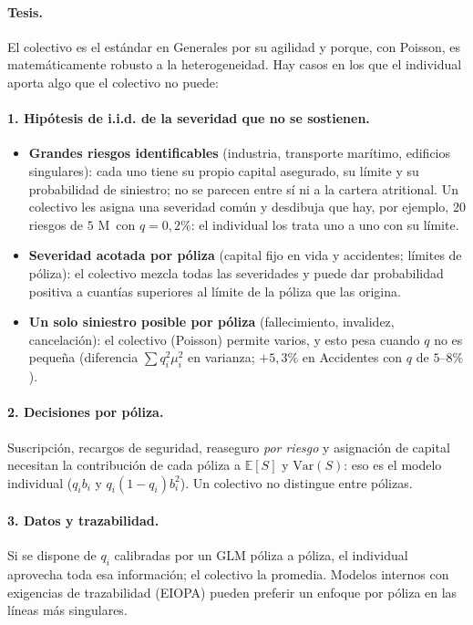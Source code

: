 \documentclass[a4paper,12pt]{article}
\newcommand{\euro}{\texteuro}
\newcommand{\E}{\mathbb{E}}
\newcommand{\Var}{\mathrm{Var}}
\begin{document}
\paragraph{Tesis.} El colectivo es el est\'andar en Generales por su agilidad y porque, con Poisson, es matem\'aticamente robusto a la heterogeneidad. Hay casos en los que el individual aporta algo que el colectivo no puede:

\paragraph{1. Hipótesis de i.i.d. de la severidad que no se sostienen.}
\begin{itemize}[leftmargin=*,itemsep=1pt]
\item \textbf{Grandes riesgos identificables} (industria, transporte mar\'itimo, edificios singulares): cada uno tiene su propio capital asegurado, su l\'imite y su probabilidad de siniestro; no se parecen entre s\'i ni a la cartera atritional. Un colectivo les asigna una severidad com\'un y desdibuja que hay, por ejemplo, 20 riesgos de $5$ M\euro\ con $q=0{,}2\%$: el individual los trata uno a uno con su l\'imite.
\item \textbf{Severidad acotada por p\'oliza} (capital fijo en vida y accidentes; l\'imites de p\'oliza): el colectivo mezcla todas las severidades y puede dar probabilidad positiva a cuant\'ias superiores al l\'imite de la p\'oliza que las origina.
\item \textbf{Un solo siniestro posible por p\'oliza} (fallecimiento, invalidez, cancelaci\'on): el colectivo (Poisson) permite varios, y esto pesa cuando $q$ no es peque\~na (diferencia $\sum q_i^2\mu_i^2$ en varianza; $+5{,}3\%$ en Accidentes con $q$ de $5$--$8\%$).
\end{itemize}

\paragraph{2. Decisiones por p\'oliza.} Suscripci\'on, recargos de seguridad, reaseguro \emph{por riesgo} y asignaci\'on de capital necesitan la contribuci\'on de cada p\'oliza a $\E[S]$ y $\Var(S)$: eso es el modelo individual ($q_i b_i$ y $q_i(1-q_i)b_i^2$). Un colectivo no distingue entre p\'olizas.

\paragraph{3. Datos y trazabilidad.} Si se dispone de $q_i$ calibradas por un GLM p\'oliza a p\'oliza, el individual aprovecha toda esa informaci\'on; el colectivo la promedia. Modelos internos con exigencias de trazabilidad (EIOPA) pueden preferir un enfoque por p\'oliza en las l\'ineas m\'as singulares.
\end{document}
